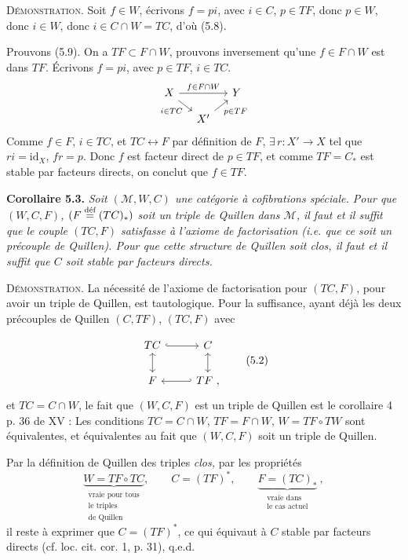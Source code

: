 \textsc{Démonstration}. Soit $f \in W$, écrivons $f = pi$, avec $i \in C$, $p \in TF$, donc $p \in W$, donc $i \in W$, donc $i \in C \cap W = TC$, d'où (5.8).

Prouvons (5.9). On a $TF \subset F \cap W$, prouvons inversement qu'une $f \in F \cap W$ est dans $TF$. Écrivons $f = pi$, avec $p \in TF$, $i \in TC$.
\[
\begin{tikzcd}[column sep=small, row sep=small]
X \arrow[rr, "f\in F\cap W"] \arrow[dr, "i\in TC"'] & & Y \\
& X' \arrow[ur, "p\in TF"'] &
\end{tikzcd}
\]
Comme $f \in F$, $i \in TC$, et $TC \longleftrightarrow F$ par définition de $F$, $\exists\, r : X' \longrightarrow X$ tel que $ri = \mathrm{id}_X$, $fr = p$. Donc $f$ est facteur direct de $p \in TF$, et comme $TF = C_{*}$ est stable par facteurs directs, on conclut que $f \in TF$.

\textbf{Corollaire 5.3.} \textit{Soit $(\mathcal{M}, W, C)$ une catégorie à cofibrations spéciale. Pour que $(W, C, F)$, $(F \defeq (TC)_{*})$ soit un triple de Quillen dans $\mathcal{M}$, il faut et il suffit que le couple $(TC, F)$ satisfasse à l'axiome de factorisation (i.e. que ce soit un précouple de Quillen). Pour que cette structure de Quillen soit clos, il faut et il suffit que $C$ soit stable par facteurs directs.} %


\textsc{Démonstration}. La nécessité de l'axiome de factorisation pour $(TC, F)$, pour avoir un triple de Quillen, est tautologique. Pour la suffisance, ayant déjà les deux précouples de Quillen $(C, TF)$, $(TC, F)$ avec

\[
\begin{tikzcd}
TC \arrow[r, hook] \arrow[d, leftrightarrow] & C \arrow[d, leftrightarrow] \\
F & TF \arrow[l, hook'] \ ,
\end{tikzcd}
\tag*{(5.2)}
\]
et $TC = C \cap W$, le fait que $(W, C, F)$ est un triple de Quillen est le corollaire 4 p. 36 de XV : Les conditions $TC = C \cap W$, $TF = F \cap W$, $W = TF \circ TW$ sont équivalentes, et équivalentes au fait que $(W, C, F)$ soit un triple de Quillen.

Par la définition de Quillen des triples \textit{clos,} par les propriétés
\[
\underbrace{W = TF \circ TC}_{\substack{\text{vraie pour tous}\\ \text{le triples}\\ \text{de Quillen}}}, \qquad C = (TF)^*, \qquad \underbrace{F = (TC)_*}_{\substack{\text{vraie dans}\\ \text{le cas actuel}}}\ , %
\]
il reste à exprimer que $C = (TF)^*$, ce qui équivaut à $C$ stable par facteurs directs (cf. loc. cit. cor. 1, p. 31), q.e.d.

